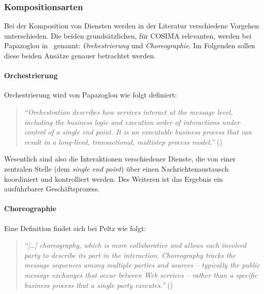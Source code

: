 \subsubsection{Kompositionsarten} %
\label{ssub:kompositionsarten}

  Bei der Komposition von Diensten werden in der Literatur verschiedene Vorgehen unterschieden. Die beiden grundsätzlichen, für COSIMA relevanten, werden bei Papazoglou in~\citep[S. 41]{papazoglou2007soc} genannt: \emph{Orchestrierung} und \emph{Choreographie}. Im Folgenden sollen diese beiden Ansätze genauer betrachtet werden.
  
\paragraph{Orchestrierung} %
\label{par:orchestrierung}
  
  Orchestrierung wird von Papazoglou wie folgt definiert:
  
  \begin{quote}
    \emph{"`Orchestration describes how services interact at the message level, including the business logic and execution order of interactions under control of a single end point. It is an executable business process that can result in a long-lived, transactional, multistep process model."'} (\citep[S. 41]{papazoglou2007soc})
  \end{quote}
  
  Wesentlich sind also die Interaktionen verschiedener Dienste, die von einer zentralen Stelle (dem \emph{single end point}) über einen Nachrichtenaustausch koordiniert und kontrolliert werden. Des Weiteren ist das Ergebnis ein ausführbarer Geschäftsprozess.


\paragraph{Choreographie} %
\label{par:choreographie}

  Eine Definition findet sich bei Peltz wie folgt:

  \begin{quote}
    \emph{"`[\ldots] choreography, which is more collaborative and allows each involved party to describe its part in the interaction. Choreography tracks the message sequences among multiple parties and sources -- typically the public message exchanges that occur between Web services -- rather than a specific business process that a single party executes."'} (\citep[S. 46]{peltz2003wso})
  \end{quote}


